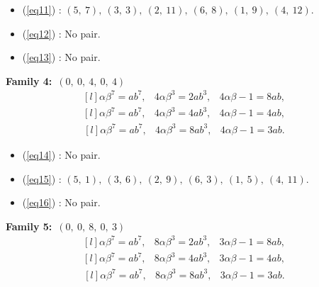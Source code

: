 \documentclass[12pt,a4wide, reqno]{amsart}
\theoremstyle{definition}
\theoremstyle{remark}
\numberwithin{equation}{section}
\begin{document}
\begin{itemize}
    \item 
    (\ref{eq11}) : $(5,~7),~(3,~3),~(2,~11),~(6,~8),~(1,~9),~(4,~12).$
    \item 
    (\ref{eq12}) : No pair.
    \item 
    (\ref{eq13}) : No pair. 
\end{itemize}
\textbf{Family 4:}~$(0,~0,~4,~0,~4)$ 
\begin{equation}\label{eq14}
    \begin{matrix*}[l]
         \alpha \beta ^7=ab^7, & 4\alpha \beta^3=2ab^3, & 4\alpha\beta -1=8ab,
    \end{matrix*}
\end{equation}
\begin{equation}\label{eq15}
    \begin{matrix*}[l]
        \alpha \beta ^7=ab^7, & 4\alpha \beta^3=4ab^3, & 4\alpha\beta -1=4ab,
    \end{matrix*}
\end{equation}
\begin{equation}\label{eq16}
    \begin{matrix*}[l]
         \alpha \beta ^7=ab^7, & 4\alpha \beta^3=8ab^3, & 4\alpha\beta -1=3ab.
    \end{matrix*}
\end{equation}
\begin{itemize}
    \item 
    (\ref{eq14}) : No pair.
    \item 
    (\ref{eq15}) : $(5,~1),~(3,~6),~(2,~9),~(6,~3),~(1,~5),~(4,~11).$
    \item 
    (\ref{eq16}) : No pair. 
\end{itemize}
\textbf{Family 5:}~$(0,~0,~8,~0,~3)$ 
\begin{equation}\label{eq17}
    \begin{matrix*}[l]
         \alpha \beta ^7=ab^7, & 8\alpha \beta^3=2ab^3, & 3\alpha\beta -1=8ab,
    \end{matrix*}
\end{equation}
\begin{equation}\label{eq18}
    \begin{matrix*}[l]
        \alpha \beta ^7=ab^7, & 8\alpha \beta^3=4ab^3, & 3\alpha\beta -1=4ab,
    \end{matrix*}
\end{equation}
\begin{equation}\label{eq19}
    \begin{matrix*}[l]
         \alpha \beta ^7=ab^7, & 8\alpha \beta^3=8ab^3, & 3\alpha\beta -1=3ab.
    \end{matrix*}
\end{equation}
\end{document}
